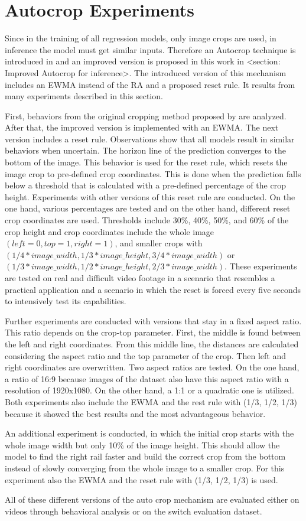 \section{Autocrop Experiments}

Since in the training of all regression models, only image crops are used, in inference the model must get similar inputs.
Therefore an Autocrop technique is introduced in \cite{tepNet2024} and an improved version is proposed in this work in <section: Improved Autocrop for inference>.
The introduced version of this mechanism includes an EWMA instead of the RA and a proposed reset rule.
It results from many experiments described in this section.

First, behaviors from the original cropping method proposed by \cite{tepNet2024} are analyzed.
After that, the improved version is implemented with an EWMA.
The next version includes a reset rule.
Observations show that all models result in similar behaviors when uncertain.
The horizon line of the prediction converges to the bottom of the image.
This behavior is used for the reset rule, which resets the image crop to pre-defined crop coordinates.
This is done when the prediction falls below a threshold that is calculated with a pre-defined percentage of the crop height.
Experiments with other versions of this reset rule are conducted.
On the one hand, various percentages are tested and on the other hand, different reset crop coordinates are used.
Thresholds include 30\%, 40\%, 50\%, and 60\% of the crop height and crop coordinates include the whole image $(left=0, top=1, right=1)$, and smaller crops with $(1/4*image\_width, 1/3*image\_height, 3/4*image\_width)$ or $(1/3*image\_width, 1/2*image\_height, 2/3*image\_width)$.
These experiments are tested on real and difficult video footage in a scenario that resembles a practical application and a scenario in which the reset is forced every five seconds to intensively test its capabilities.

Further experiments are conducted with versions that stay in a fixed aspect ratio.
This ratio depends on the crop-top parameter.
First, the middle is found between the left and right coordinates.
From this middle line, the distances are calculated considering the aspect ratio and the top parameter of the crop.
Then left and right coordinates are overwritten. Two aspect ratios are tested.
On the one hand, a ratio of 16:9 because images of the dataset also have this aspect ratio with a resolution of 1920x1080.
On the other hand, a 1:1 or a quadratic one is utilized.
Both experiments also include the EWMA and the rest rule with (1/3, 1/2, 1/3) because it showed the best results and the most advantageous behavior.

An additional experiment is conducted, in which the initial crop starts with the whole image width but only 10\% of the image height.
This should allow the model to find the right rail faster and build the correct crop from the bottom instead of slowly converging from the whole image to a smaller crop.
For this experiment also the EWMA and the reset rule with (1/3, 1/2, 1/3) is used.

All of these different versions of the auto crop mechanism are evaluated either on videos through behavioral analysis or on the switch evaluation dataset.